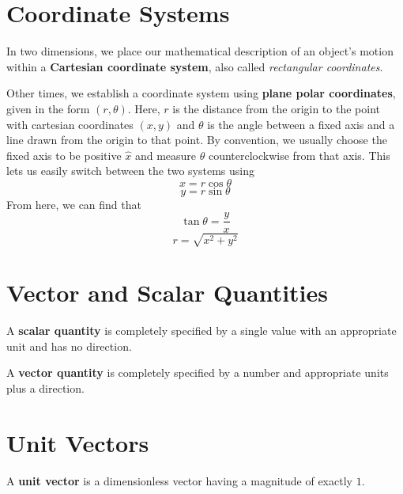 \section*{Coordinate Systems}

In two dimensions, we place our mathematical description of an object's motion
within a \textbf{Cartesian coordinate system}, also
called \emph{rectangular coordinates}.

Other times, we establish a coordinate system using \textbf{plane polar
coordinates}, given in
the form $(r,\theta)$. Here, $r$ is the distance from the origin to the point
with cartesian coordinates $(x, y)$ and $\theta$ is the angle between a fixed
axis and a line drawn from the origin to that point. By convention, we usually
choose the fixed axis to be positive $\hat x$ and measure $\theta$ counterclockwise
from that axis. This lets us easily switch between the two systems using
\begin{equation}
  \label{eq:xcos}
  x = r \cos \theta
\end{equation}
\begin{equation}
  \label{eq:ysin}
  y = r \sin \theta
\end{equation}
From here, we can find that
\begin{equation}
  \label{eq:tantheta}
  \tan \theta = \frac{y}{x}
\end{equation}
\begin{equation}
  \label{eq:rpyth}
  r = \sqrt{x^2 + y^2}
\end{equation}

\section*{Vector and Scalar Quantities}

A \textbf{scalar quantity} is completely specified by a single value with an
appropriate unit and has no direction.

A \textbf{vector quantity} is completely specified by a number and appropriate
units plus a direction.

\section*{Unit Vectors}

A \textbf{unit vector} is a dimensionless vector having a
magnitude of exactly $1$.


%

